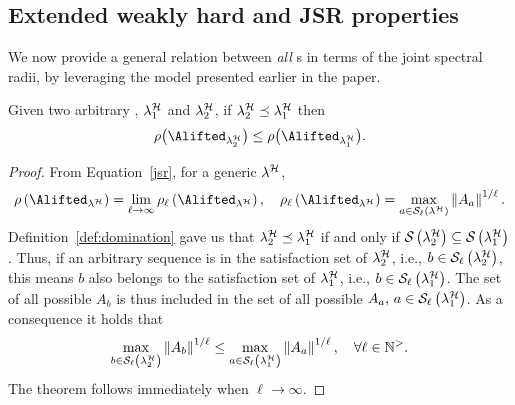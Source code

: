 
\subsection{Extended weakly hard and JSR properties}
\label{sec:analytic_results}
%
We now provide a general relation between \emph{all} \ewhc{}s in terms of the joint spectral radii, by leveraging the model presented earlier in the paper.

\begin{theorem}%
    \label{th:rho_dominance_general}%
    Given two arbitrary \ewhc{}, $\lambda_1^{\mathcal{H}}$ and $\lambda_2^{\mathcal{H}}$, if $\lambda_2^{\mathcal{H}} \preceq \lambda_1^{\mathcal{H}}$ then
    \begin{equation*}
        \rho\bigl(\Alifted_{\lambda_2^\strat}\bigr) \leq \rho\bigl(\Alifted_{\lambda_1^\strat}\bigr).
    \end{equation*}

    \begin{proof}
        From Equation~\eqref{jsr}, for a generic \ewhc{} $\lambda^{\mathcal{H}}$,
        \begin{equation*}
            \rho\left(\Alifted_{\lambda^\strat}\right) = \lim_{\ell\rightarrow \infty}\rho_\ell\left(\Alifted_{\lambda^\strat}\right), \quad \rho_\ell\left(\Alifted_{\lambda^\strat}\right) = \max_{a \in \sset{\ell}{\lambda^\strat}}\norm{A_{a}}^{1/\ell}.
        \end{equation*}
        Definition~\ref{def:domination} gave us that $\lambda^{\mathcal{H}}_2 \preceq \lambda^{\mathcal{H}}_1$ if and only if $\mathcal{S}_{}\left( \lambda^{\mathcal{H}}_2 \right) \subseteq \mathcal{S}_{}\left( \lambda^{\mathcal{H}}_1 \right)$.
        Thus, if an arbitrary sequence is in the satisfaction set of $\lambda^{\mathcal{H}}_2$, i.e., $b \in \mathcal{S}_{\ell}\left(  \lambda^{\mathcal{H}}_2  \right)$, this means $b$ also belongs to the satisfaction set of $\lambda^{\mathcal{H}}_1$, i.e., $b \in \mathcal{S}_{\ell}\left(  \lambda^{\mathcal{H}}_1  \right)$.
        The set of all possible $A_{b}$ is thus included in the set of all possible $A_{a},\, a \in \mathcal{S}_{\ell}\left(  \lambda^{\mathcal{H}}_1  \right)$.
        As a consequence it holds that
        \begin{equation*}
            \max_{b \in \mathcal{S}_{\ell}\left( \lambda^{\mathcal{H}}_2 \right)}\left\lVert A_{b}\right\rVert^{1/\ell} \leq
            \max_{a \in \mathcal{S}_{\ell}\left( \lambda^{\mathcal{H}}_1 \right)}\left\lVert A_{a}\right\rVert^{1/\ell}, \quad
            \forall \ell\in\mathbb{N}^{>}.
        \end{equation*}
        The theorem follows immediately when $\ell\rightarrow \infty$.
    \end{proof}
\end{theorem}


